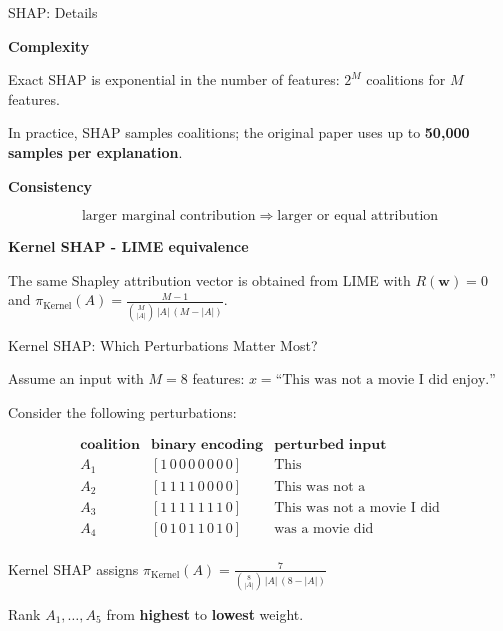 \documentclass[11pt,compress,t,notes=noshow, xcolor=table]{beamer}
\begin{document}

\begin{vbframe}{SHAP: Details}

\textbf{Complexity}

Exact SHAP is exponential in the number of features: $2^M$ coalitions for \(M\) features.

In practice, SHAP samples coalitions;
the original paper uses up to \textbf{50,000 samples per explanation}.

\medskip

\textbf{Consistency}

\[
\text{larger marginal contribution}
\;\Rightarrow\;
\text{larger or equal attribution}
\]

\medskip

\textbf{Kernel SHAP - LIME equivalence}

The same Shapley attribution vector is obtained from LIME with $R(\mathbf w)=0$ and $\pi_{\mathrm{Kernel}}(A)
=
\frac{M-1}
{\binom{M}{|A|}\,|A|\,(M-|A|)}.
$

\end{vbframe}



\begin{vbframe}{Kernel SHAP: Which Perturbations Matter Most?}

Assume an input with \(M=8\) features: $x=
\text{``This was not a movie I did enjoy.''}$

Consider the following perturbations:

\[
\begin{array}{c|c|l}
\textbf{coalition} & \textbf{binary encoding} & \textbf{perturbed input}\\
\hline
A_1 &
[1\,0\,0\,0\,0\,0\,0\,0] &
\text{This}
\\[0.2em]

A_2 &
[1\,1\,1\,1\,0\,0\,0\,0] &
\text{This was not a}
\\[0.2em]

A_3 &
[1\,1\,1\,1\,1\,1\,1\,0] &
\text{This was not a movie I did}
\\[0.2em]

A_4 &
[0\,1\,0\,1\,1\,0\,1\,0] &
\text{was a movie did}
\\[0.2em]

\end{array}
\]

Kernel SHAP assigns $\pi_{\mathrm{Kernel}}(A)
=
\frac{7}
{\binom{8}{|A|}\,|A|\,(8-|A|)}$

\begin{center}
\ques Rank \(A_1,\ldots,A_5\) from
\textbf{highest} to \textbf{lowest} weight.
\end{center}

\end{vbframe}
\end{document}
